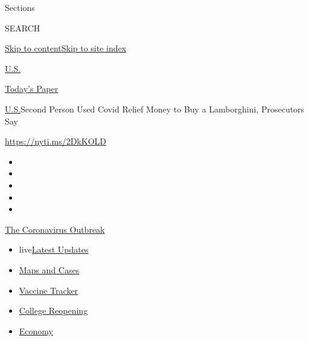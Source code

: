Sections

SEARCH

\protect\hyperlink{site-content}{Skip to
content}\protect\hyperlink{site-index}{Skip to site index}

\href{https://www.nytimes3xbfgragh.onion/section/us}{U.S.}

\href{https://myaccount.nytimes3xbfgragh.onion/auth/login?response_type=cookie\&client_id=vi}{}

\href{https://www.nytimes3xbfgragh.onion/section/todayspaper}{Today's
Paper}

\href{/section/us}{U.S.}\textbar{}Second Person Used Covid Relief Money
to Buy a Lamborghini, Prosecutors Say

\url{https://nyti.ms/2DkKOLD}

\begin{itemize}
\item
\item
\item
\item
\item
\end{itemize}

\href{https://www.nytimes3xbfgragh.onion/news-event/coronavirus?action=click\&pgtype=Article\&state=default\&region=TOP_BANNER\&context=storylines_menu}{The
Coronavirus Outbreak}

\begin{itemize}
\tightlist
\item
  live\href{https://www.nytimes3xbfgragh.onion/2020/08/04/world/coronavirus-cases.html?action=click\&pgtype=Article\&state=default\&region=TOP_BANNER\&context=storylines_menu}{Latest
  Updates}
\item
  \href{https://www.nytimes3xbfgragh.onion/interactive/2020/us/coronavirus-us-cases.html?action=click\&pgtype=Article\&state=default\&region=TOP_BANNER\&context=storylines_menu}{Maps
  and Cases}
\item
  \href{https://www.nytimes3xbfgragh.onion/interactive/2020/science/coronavirus-vaccine-tracker.html?action=click\&pgtype=Article\&state=default\&region=TOP_BANNER\&context=storylines_menu}{Vaccine
  Tracker}
\item
  \href{https://www.nytimes3xbfgragh.onion/2020/08/02/us/covid-college-reopening.html?action=click\&pgtype=Article\&state=default\&region=TOP_BANNER\&context=storylines_menu}{College
  Reopening}
\item
  \href{https://www.nytimes3xbfgragh.onion/live/2020/08/04/business/stock-market-today-coronavirus?action=click\&pgtype=Article\&state=default\&region=TOP_BANNER\&context=storylines_menu}{Economy}
\end{itemize}


